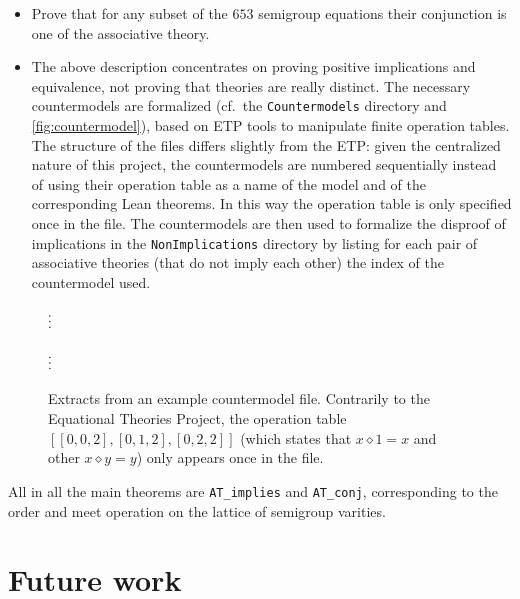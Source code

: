 \documentclass[12pt]{amsart}
\theoremstyle{plain}
\theoremstyle{definition}
\newcommand{\op}{\diamond}
\begin{document}
\begin{itemize}
\item Prove that for any subset of the $653$ semigroup equations their conjunction is one of the associative theory.

\item The above description concentrates on proving positive implications and equivalence, not proving that theories are really distinct.  The necessary countermodels are formalized (cf.\ the \texttt{Countermodels} directory and \autoref{fig:countermodel}), based on ETP tools to manipulate finite operation tables.  The structure of the files differs slightly from the ETP: given the centralized nature of this project, the countermodels are numbered sequentially instead of using their operation table as a name of the model and of the corresponding Lean theorems.  In this way the operation table is only specified once in the file.  The countermodels are then used to formalize the disproof of implications in the \texttt{NonImplications} directory by listing for each pair of associative theories (that do not imply each other) the index of the countermodel used.
\end{itemize}

\begin{figure}\centering
{}

$\vdots\strut$


$\vdots\strut$

\caption{\label{fig:countermodel}Extracts from an example countermodel file.  Contrarily to the Equational Theories Project, the operation table $[[0,0,2],[0,1,2],[0,2,2]]$ (which states that $x\op 1=x$ and other $x\op y=y$) only appears once in the file.}
\end{figure}

All in all the main theorems are \texttt{AT\_implies} and \texttt{AT\_conj}, corresponding to the order and meet operation on the lattice of semigroup varities.


\section{Future work}
\label{sec:future}
\end{document}
